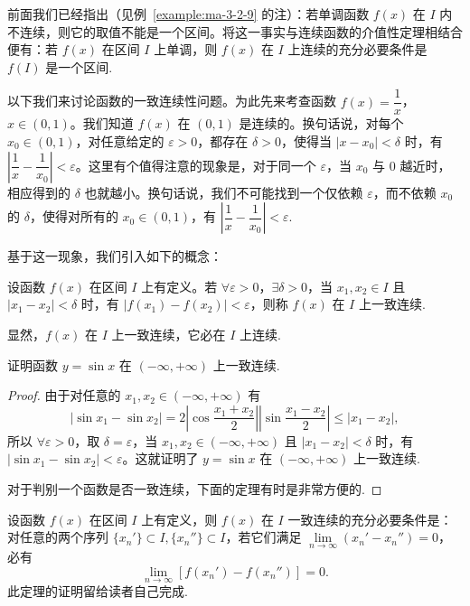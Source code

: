 \begin{remark}\label{remark:ma-3-source-109}
前面我们已经指出（见例~\ref{example:ma-3-2-9} 的注）：若单调函数 $f(x)$ 在 $I$ 内不连续，则它的取值不能是一个区间。将这一事实与连续函数的介值性定理相结合便有：若 $f(x)$ 在区间 $I$ 上单调，则 $f(x)$ 在 $I$ 上连续的充分必要条件是 $f(I)$ 是一个区间.
\end{remark}

以下我们来讨论函数的一致连续性问题。为此先来考查函数 $f(x)=\dfrac1x$，$x\in(0,1)$。我们知道 $f(x)$ 在 $(0,1)$ 是连续的。换句话说，对每个 $x_0\in(0,1)$，对任意给定的 $\varepsilon>0$，都存在 $\delta>0$，使得当 $|x-x_0|<\delta$ 时，有 $\left|\dfrac1x-\dfrac1{x_0}\right|<\varepsilon$。这里有个值得注意的现象是，对于同一个 $\varepsilon$，当 $x_0$ 与 $0$ 越近时，相应得到的 $\delta$ 也就越小。换句话说，我们不可能找到一个仅依赖 $\varepsilon$，而不依赖 $x_0$ 的 $\delta$，使得对所有的 $x_0\in(0,1)$，有 $\left|\dfrac1x-\dfrac1{x_0}\right|<\varepsilon$.

基于这一现象，我们引入如下的概念：

\begin{definition}\label{definition:ma-3-3-1}
设函数 $f(x)$ 在区间 $I$ 上有定义。若 $\forall\varepsilon>0$，$\exists\delta>0$，当 $x_1,x_2\in I$ 且 $|x_1-x_2|<\delta$ 时，有 $|f(x_1)-f(x_2)|<\varepsilon$，则称 $f(x)$ 在 $I$ 上一致连续.
\end{definition}

显然，$f(x)$ 在 $I$ 上一致连续，它必在 $I$ 上连续.

\begin{example}\label{example:ma-3-3-7}
证明函数 $y=\sin x$ 在 $(-\infty,+\infty)$ 上一致连续.
\end{example}


\begin{proof}
由于对任意的 $x_1,x_2\in(-\infty,+\infty)$ 有
\[
  |\sin x_1-\sin x_2|
  =
  2\left|\cos\frac{x_1+x_2}{2}\right|
  \left|\sin\frac{x_1-x_2}{2}\right|
  \leqslant |x_1-x_2|,
\]
所以 $\forall\varepsilon>0$，取 $\delta=\varepsilon$，当 $x_1,x_2\in(-\infty,+\infty)$ 且 $|x_1-x_2|<\delta$ 时，有 $|\sin x_1-\sin x_2|<\varepsilon$。这就证明了 $y=\sin x$ 在 $(-\infty,+\infty)$ 上一致连续.

对于判别一个函数是否一致连续，下面的定理有时是非常方便的.
\end{proof}


\begin{theorem}\label{theorem:ma-3-3-5}
设函数 $f(x)$ 在区间 $I$ 上有定义，则 $f(x)$ 在 $I$ 一致连续的充分必要条件是：对任意的两个序列 $\{x_n'\}\subset I,\{x_n''\}\subset I$，若它们满足 $\lim\limits_{n\to\infty}(x_n'-x_n'')=0$，必有
\[
  \lim_{n\to\infty}[f(x_n')-f(x_n'')]=0.
\]
此定理的证明留给读者自己完成.
\end{theorem}


